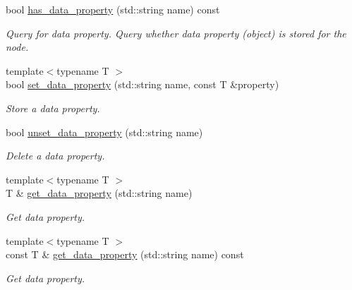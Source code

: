 \begin{DoxyCompactItemize}
bool \hyperlink{structlb_1_1node_a2f4a2e22c21a7b59781d33e889ad1697}{has\-\_\-data\-\_\-property} (std\-::string name) const 
\begin{DoxyCompactList}\small\item\em \-Query for data property. \-Query whether data property (object) is stored for the node. \end{DoxyCompactList}\item 
{\footnotesize template$<$typename T $>$ }\\bool \hyperlink{structlb_1_1node_a7627949c2689b5b622f864377eb6cff6}{set\-\_\-data\-\_\-property} (std\-::string name, const \-T \&property)
\begin{DoxyCompactList}\small\item\em \-Store a data property. \end{DoxyCompactList}\item 
bool \hyperlink{structlb_1_1node_a953c03516f6cd48a485b2950e2214f3a}{unset\-\_\-data\-\_\-property} (std\-::string name)
\begin{DoxyCompactList}\small\item\em \-Delete a data property. \end{DoxyCompactList}\item 
{\footnotesize template$<$typename T $>$ }\\\-T \& \hyperlink{structlb_1_1node_a397d8ce70841942ca893d3c568cc2ab5}{get\-\_\-data\-\_\-property} (std\-::string name)
\begin{DoxyCompactList}\small\item\em \-Get data property. \end{DoxyCompactList}\item 
{\footnotesize template$<$typename T $>$ }\\const \-T \& \hyperlink{structlb_1_1node_ac09b3656e36e2605848b4d3c702db19e}{get\-\_\-data\-\_\-property} (std\-::string name) const 
\begin{DoxyCompactList}\small\item\em \-Get data property. \end{DoxyCompactList}\end{DoxyCompactItemize}

